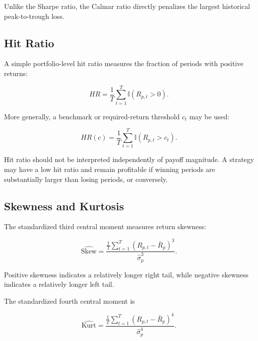 \documentclass[11pt,a4paper]{article}
\begin{document}
Unlike the Sharpe ratio, the Calmar ratio directly penalizes the largest
historical peak-to-trough loss.


\subsection{Hit Ratio}

A simple portfolio-level hit ratio measures the fraction of periods with
positive returns:

\begin{equation}
\boxed{
HR
=
\frac{1}{T}
\sum_{t=1}^{T}
\mathbb{I}
\left(
R_{p,t}>0
\right).
}
\end{equation}

More generally, a benchmark or required-return threshold $c_t$ may be used:

\begin{equation}
HR(c)
=
\frac{1}{T}
\sum_{t=1}^{T}
\mathbb{I}
\left(
R_{p,t}>c_t
\right).
\end{equation}

Hit ratio should not be interpreted independently of payoff magnitude. A
strategy may have a low hit ratio and remain profitable if winning periods are
substantially larger than losing periods, or conversely.


\subsection{Skewness and Kurtosis}

The standardized third central moment measures return skewness:

\begin{equation}
\boxed{
\widehat{\mathrm{Skew}}
=
\frac{
\frac{1}{T}
\sum_{t=1}^{T}
(R_{p,t}-\bar{R}_p)^3
}{
\widehat{\sigma}_p^3
}.
}
\end{equation}

Positive skewness indicates a relatively longer right tail, while negative
skewness indicates a relatively longer left tail.

The standardized fourth central moment is

\begin{equation}
\boxed{
\widehat{\mathrm{Kurt}}
=
\frac{
\frac{1}{T}
\sum_{t=1}^{T}
(R_{p,t}-\bar{R}_p)^4
}{
\widehat{\sigma}_p^4
}.
}
\end{equation}
\end{document}

